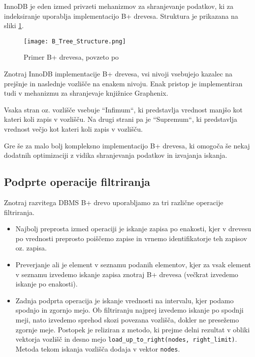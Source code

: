 \documentclass[a4paper,12pt,openright]{book}
\begin{document}
        InnoDB je eden izmed privzeti mehanizmov za shranjevanje podatkov, ki za indeksiranje uporablja implementacijo B+ drevesa. Struktura je prikazana na sliki \ref{btree_innodb}.

        \begin{figure}[H]
            \centerline{\texttt{[image: B\_Tree\_Structure.png]}}
            \caption{Primer B+ drevesa, povzeto po \cite{BPTREE_INNODB}}
            \label{btree_innodb}
        \end{figure}

        \noindent
        Znotraj InnoDB implementacije B+ drevesa, vsi nivoji vsebujejo kazalec na prejšnje in naslednje vozlišče na enakem nivoju. Enak pristop je implementiran tudi v mehanizmu za shranjevaje knjižnice Graphenix. 
        
        Vsaka stran oz. vozlišče vsebuje ``Infimum``, ki predstavlja vrednost manjšo kot kateri koli zapis v vozlišču. Na drugi strani pa je ``Supremum``, ki predstavlja vrednost večjo kot kateri koli zapis v vozlišču.

        Gre še za malo bolj kompleksno implementacijo B+ drevesa, ki omogoča še nekaj dodatnih optimizaciji z vidika shranjevanja podatkov in izvajanja iskanja.
        
        \subsection{Podprte operacije filtriranja}
        
        Znotraj razvitega DBMS B+ drevo uporabljamo za tri različne operacije filtriranja.
        \begin{itemize}
            \item Najbolj preprosta izmed operaciji je iskanje zapisa po enakosti, kjer v drevesu po vrednosti preprosto poiščemo zapise in vrnemo identifikatorje teh zapisov oz. zapisa.
            \item Preverjanje ali je element v seznamu podanih elementov, kjer za vsak element v seznamu izvedemo iskanje zapisa znotraj B+ drevesa (večkrat izvedemo iskanje po enakosti).
            \item Zadnja podprta operacija je iskanje vrednosti na intervalu, kjer podamo spodnjo in zgornjo mejo. Ob filtriranju najprej izvedemo iskanje po spodnji meji, nato izvedemo sprehod skozi povezana vozlišča, dokler ne presežemo zgornje meje. Postopek je reliziran z metodo, ki prejme delni rezultat v obliki vektorja vozlišč in desno mejo {\tt load\_up\_to\_right(nodes, right\_limit)}. Metoda tekom iskanja vozlišča dodaja v vektor {\tt nodes}.
        \end{itemize}
\end{document}
